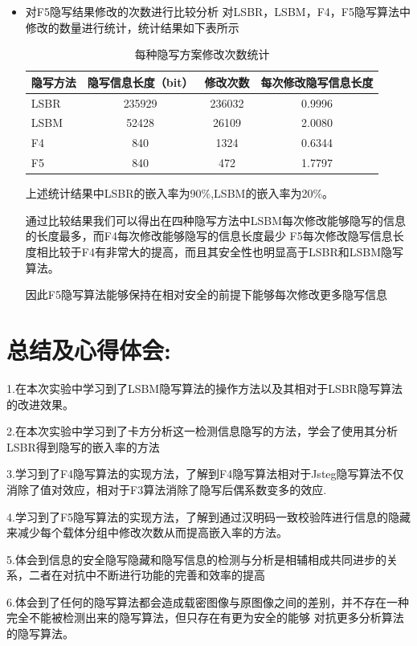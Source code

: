\documentclass[a4paper,11pt,UTF8]{ctexart}
\begin{document}
\begin{itemize}
      \item 对F5隐写结果修改的次数进行比较分析
        对LSBR，LSBM，F4，F5隐写算法中修改的数量进行统计，统计结果如下表所示

        \begin{table}[H]
          \caption{每种隐写方案修改次数统计}\label{tab1}
            \centering
          \begin{tabular*}{0.75\textwidth}{@{\extracolsep{\fill}}lccc}
              \toprule
              隐写方法          &隐写信息长度（bit）        &修改次数         &每次修改隐写信息长度                \\
              \midrule
              LSBR             &235929                    &236032          &0.9996                             \\
              LSBM             &52428                     &26109           &2.0080                             \\
              F4               &840                       &1324            &0.6344                              \\
              F5               &840                       &472             &1.7797                           \\ 
              \bottomrule
          \end{tabular*}
        \end{table}
        上述统计结果中LSBR的嵌入率为90\%,LSBM的嵌入率为20\%。\par
        通过比较结果我们可以得出在四种隐写方法中LSBM每次修改能够隐写的信息的长度最多，而F4每次修改能够隐写的信息长度最少
        F5每次修改隐写信息长度相比较于F4有非常大的提高，而且其安全性也明显高于LSBR和LSBM隐写算法。\par
        因此F5隐写算法能够保持在相对安全的前提下能够每次修改更多隐写信息

    \end{itemize}

\section{总结及心得体会:}
  1.在本次实验中学习到了LSBM隐写算法的操作方法以及其相对于LSBR隐写算法的改进效果。\par
  2.在本次实验中学习到了卡方分析这一检测信息隐写的方法，学会了使用其分析LSBR得到隐写的嵌入率的方法\par
  3.学习到了F4隐写算法的实现方法，了解到F4隐写算法相对于Jsteg隐写算法不仅消除了值对效应，相对于F3算法消除了隐写后偶系数变多的效应.\par
  4.学习到了F5隐写算法的实现方法，了解到通过汉明码一致校验阵进行信息的隐藏来减少每个载体分组中修改次数从而提高嵌入率的方法。\par
  5.体会到信息的安全隐写隐藏和隐写信息的检测与分析是相辅相成共同进步的关系，二者在对抗中不断进行功能的完善和效率的提高\par
  6.体会到了任何的隐写算法都会造成载密图像与原图像之间的差别，并不存在一种完全不能被检测出来的隐写算法，但只存在有更为安全的能够
  对抗更多分析算法的隐写算法。\par


\vspace{4cm}
\end{document}
